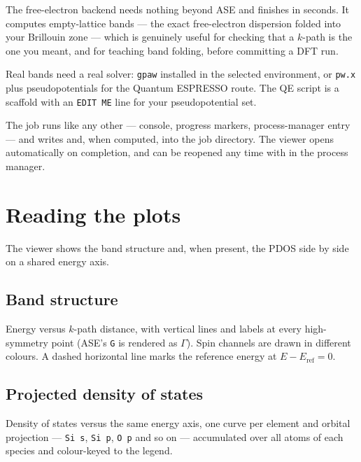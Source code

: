 \begin{caltip}
The free-electron backend needs nothing beyond ASE and finishes in seconds.
It computes empty-lattice bands --- the exact free-electron dispersion
folded into your Brillouin zone --- which is genuinely useful for checking
that a $k$-path is the one you meant, and for teaching band folding, before
committing a DFT run.
\end{caltip}

\begin{calwarn}
Real bands need a real solver: \texttt{gpaw} installed in the selected
environment, or \texttt{pw.x} plus pseudopotentials for the Quantum
ESPRESSO route. The QE script is a scaffold with an \texttt{EDIT ME} line
for your pseudopotential set.
\end{calwarn}

The job runs like any other --- console, progress markers, process-manager
entry --- and writes  and, when computed,
 into the job directory. The viewer opens automatically on
completion, and can be reopened any time with  in the
process manager.

\section{Reading the plots}

The viewer shows the band structure and, when present, the PDOS side by
side on a shared energy axis.

\subsection{Band structure}

Energy versus $k$-path distance, with vertical lines and labels at every
high-symmetry point (ASE's \texttt{G} is rendered as $\Gamma$). Spin
channels are drawn in different colours. A dashed horizontal line marks the
reference energy at $E - E_\text{ref} = 0$.

\subsection{Projected density of states}

Density of states versus the same energy axis, one curve per element and
orbital projection --- \texttt{Si s}, \texttt{Si p}, \texttt{O p} and so on
--- accumulated over all atoms of each species and colour-keyed to the
legend.

